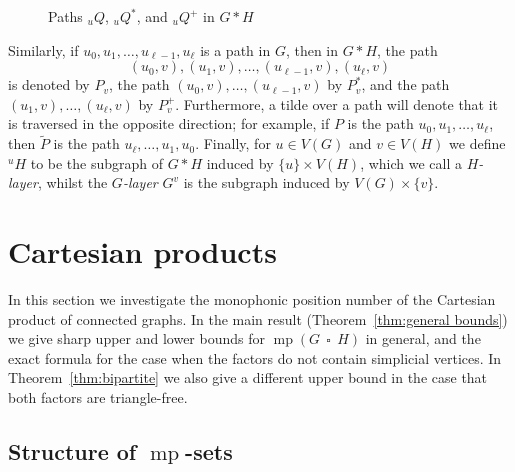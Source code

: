 \documentclass[12pt]{article}
\DeclareMathOperator {\mono} {mp}
\DeclareMathOperator{\cp}{\,\square\,}
\begin{document}
\begin{figure}[ht!]
\begin{center}
\caption{Paths $_uQ$, $_uQ^\ast$, and $_uQ^+$ in $G\ast H$}
	\label{fig:special-paths-in-products}
\end{center}
\end{figure}
 
Similarly, if $u_0, u_1,\dots ,u_{\ell -1}, u_{\ell }$ is a path in $G$, then in $G \ast H$, the path
$$(u_0,v),(u_1,v),\dots ,(u_{\ell -1},v),(u_{\ell },v)$$ 
is denoted by $P_v$, the path $(u_0,v),\dots ,(u_{\ell-1},v)$ by $P^\ast_v$, and the path $(u_1,v),\dots ,(u_{\ell},v)$ by $P^+_v$. Furthermore, a tilde over a path will denote that it is traversed in the opposite direction; for example, if $P$ is the path $u_0,u_1,\dots ,u_{\ell }$, then $\widetilde{P}$ is the path $u_{\ell },\dots, u_1,u_0$. Finally, for $u \in V(G)$ and $v \in V(H)$ we define $^uH$ to be the subgraph of $G \ast H$ induced by $\{ u\} \times V(H)$, which we call a \emph{$H$-layer}, whilst the \emph{$G$-layer} $G^v$ is the subgraph induced by $V(G) \times \{ v\} $.  
\fi
 
\section{Cartesian products}\label{sec:Cartesian}

In this section we investigate the monophonic position number of the Cartesian product of connected graphs. In the main result (Theorem~\ref{thm:general bounds}) we give sharp upper and lower bounds for $\mono(G\cp H)$ in general, and the exact formula for the case when the factors do not contain simplicial vertices. In Theorem~\ref{thm:bipartite} we also give a different upper bound in the case that both factors are triangle-free.   

\subsection{Structure of $\mono $-sets}
\end{document}
